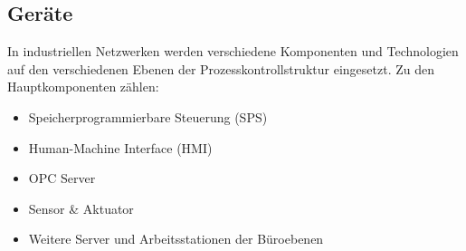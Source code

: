 \subsection{Geräte}
In industriellen Netzwerken werden verschiedene Komponenten und Technologien auf den verschiedenen Ebenen der Prozesskontrollstruktur eingesetzt. Zu den Hauptkomponenten zählen:
\begin{itemize}
\item Speicherprogrammierbare Steuerung (SPS)
\item Human-Machine Interface (HMI)
\item OPC Server
\item Sensor \& Aktuator
\item Weitere Server und Arbeitsstationen der Büroebenen
\end{itemize}

